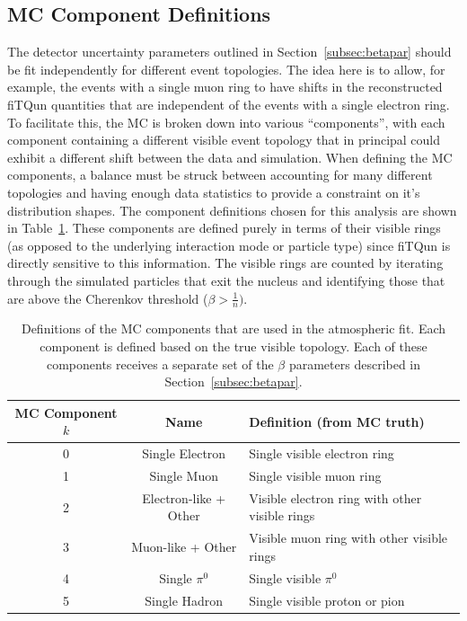 {%
\subsection{MC Component Definitions}
\label{subsec:components}

The detector uncertainty parameters outlined in Section~\ref{subsec:betapar}
should be fit independently for different event topologies. The idea here is to
allow, for example, the events with a single muon ring to have shifts in the
reconstructed fiTQun quantities that are independent of the events with a
single electron ring.  To facilitate this, the MC is broken down into various
``components'', with each component containing a different visible event
topology that in principal could exhibit a different shift between the data and
simulation.  When defining the MC components, a balance must be struck between
accounting for many different topologies and having enough data statistics to
provide a constraint on it's distribution shapes.  The component definitions
chosen for this analysis are shown in Table~\ref{tab:components}.  These
components are defined purely in terms of their visible rings (as opposed to
the underlying interaction mode or particle type) since fiTQun is directly
sensitive to this information.  The visible rings are counted by iterating
through the simulated particles that exit the nucleus and identifying those
that are above the Cherenkov threshold ($\beta > \frac{1}{n})$.

\begin{table}
  \centering
  \begin{tabular}{c | c | l }
    \hline\hline
    MC Component $k$ & Name & Definition (from MC truth) \\
    \hline
    0 & Single Electron & Single visible electron ring \\
    1 & Single Muon & Single visible muon ring  \\
    2 & Electron-like + Other & Visible electron ring with other visible rings  \\
    3 & Muon-like + Other & Visible muon ring with other visible rings  \\
    4 & Single $\pi^{0}$ & Single visible $\pi^{0}$  \\
    5 & Single Hadron &Single visible proton or pion  \\
    \hline\hline
  \end{tabular}
  \caption{Definitions of the MC components that are used in the atmospheric
  fit.  Each component is defined based on the true visible topology. Each of these
  components receives a separate set of the $\beta$ parameters described in
  Section~\ref{subsec:betapar}. }
  \label{tab:components}
\end{table}



}
